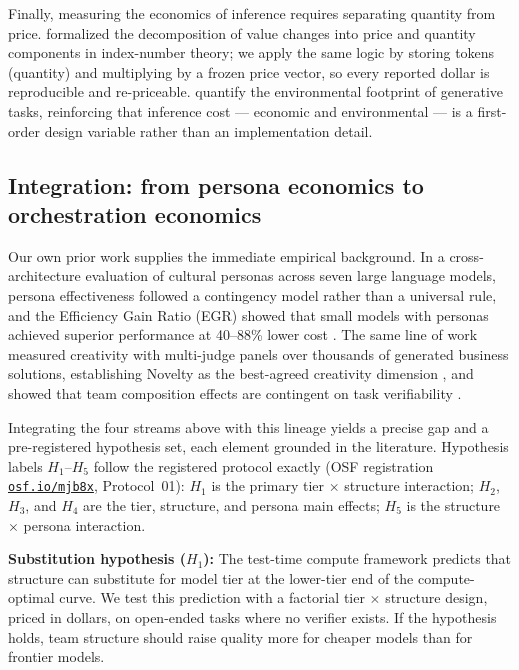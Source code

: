 \documentclass[12pt,a4paper]{article}
\begin{document}
Finally, measuring the economics of inference requires separating quantity from
price. \citet{Diewert1976} formalized the decomposition of value changes into
price and quantity components in index-number theory; we apply the same logic
by storing tokens (quantity) and multiplying by a frozen price vector, so every
reported dollar is reproducible and re-priceable. \citet{TomlinsonEtAl2024}
quantify the environmental footprint of generative tasks, reinforcing that
inference cost --- economic and environmental --- is a first-order design
variable rather than an implementation detail.

\subsection{Integration: from persona economics to orchestration economics}

Our own prior work supplies the immediate empirical background. In a
cross-architecture evaluation of cultural personas across seven large language
models, persona effectiveness followed a contingency model rather than a
universal rule, and the Efficiency Gain Ratio (EGR) showed that small models
with personas achieved superior performance at 40--88\% lower cost
\citep{Hariri2026b}. The same line of work measured creativity with multi-judge
panels over thousands of generated business solutions, establishing Novelty as
the best-agreed creativity dimension \citep{Hariri2025a}, and showed that team
composition effects are contingent on task verifiability \citep{Hariri2025b}.

Integrating the four streams above with this lineage yields a precise gap and
a pre-registered hypothesis set, each element grounded in the literature.
Hypothesis labels $H_1$--$H_5$ follow the registered protocol exactly
(OSF registration \href{https://osf.io/mjb8x}{\texttt{osf.io/mjb8x}},
Protocol~01): $H_1$ is the primary tier $\times$ structure interaction;
$H_2$, $H_3$, and $H_4$ are the tier, structure, and persona main effects;
$H_5$ is the structure $\times$ persona interaction.

\medskip
\noindent\textbf{Substitution hypothesis ($H_1$):} The test-time compute
framework \citep{SnellEtAl2024} predicts that structure can substitute for
model tier at the lower-tier end of the compute-optimal curve. We test this
prediction with a factorial tier $\times$ structure design, priced in dollars,
on open-ended tasks where no verifier exists. If the hypothesis holds, team
structure should raise quality more for cheaper models than for frontier
models.
\end{document}
